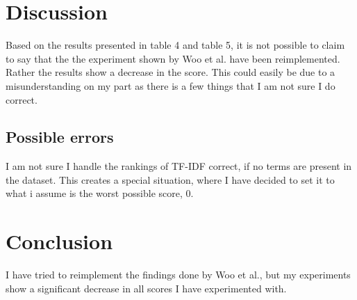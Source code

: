 \documentclass{sig-alternate}
\begin{document}
\section{Discussion}
Based on the results presented in table 4 and table 5, it is not possible to claim to say that the the experiment shown by Woo et al.\cite{cummins2011improved} have been reimplemented. Rather the results show a decrease in the score. This could easily be due to a misunderstanding on my part as there is a few things that I am not sure I do correct. 


\subsection{Possible errors}
I am not sure I handle the rankings of TF-IDF correct, if no terms are present in the dataset. This creates a special situation, where I have decided to set it to what i assume is the worst possible score, 0.

\section{Conclusion}
I have tried to reimplement the findings done by Woo et al.\cite{cummins2011improved}, but my experiments show a significant decrease in all scores I have experimented with.


\end{document}
